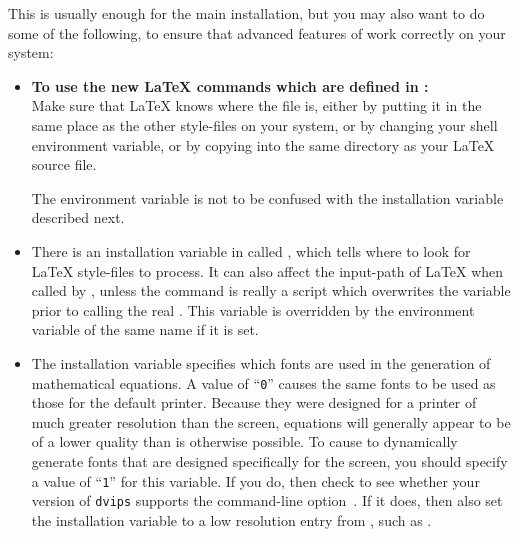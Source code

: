 \medskip\htmlrule[50\% center]
\noindent
This is usually enough for the main installation, but you may also 
want to do some of the following, to ensure that advanced features 
of \latextohtml{} work correctly on your system:
\begin{itemize}
%
%
\item 
\textbf{To use the new \LaTeX{}  commands 
which are defined in :}\\
Make sure that \LaTeX{}  knows where the  file is, 
either by putting it in the same place as the other style-files on your system, 
or by changing your  shell environment variable,
or by copying  into the same directory as your \LaTeX{}  source file.

The environment variable  is not to be confused with 
the \latextohtml{} installation variable  described next.
\par

%
\item
There is an installation variable in 
called , 
which tells \latextohtml{} where to look for \LaTeX{} style-files to process.  
It can also affect the input-path of \LaTeX{} when called by \latextohtml,
unless the command  is really a script 
which overwrites the  variable 
prior to calling the real .
This variable is overridden by the environment variable of the same name 
if it is set.

%
\item
The installation variable  specifies which
fonts are used in the generation of mathematical equations.  A value
of ``\texttt{0}'' causes the same fonts to be used as those for the default
printer.  Because they were designed for a printer of much greater
resolution than the screen, equations will generally appear to be
of a lower quality than is otherwise possible.  To cause \latextohtml{} to
dynamically generate fonts that are designed specifically for the
screen, you should specify a value of ``\texttt{1}'' for this variable.
If you do, then check to see whether your version of \texttt{dvips}
supports the command-line option \,.  If it does,
then also set the installation variable  to
a low resolution entry from , such as .


\end{itemize}
